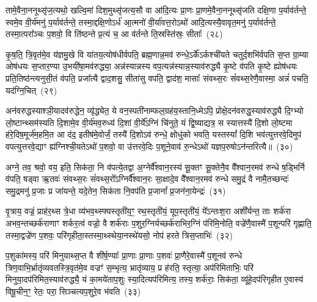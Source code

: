 तामे॒वैना॒ननूथ्सृ॑ज॒त्यथो॒ खल्वि॒मां दिश॒मुथ्सृ॑जत्य॒सौ वा आ॑दि॒त्यः प्रा॒णः प्रा॒णमे॒वैना॒ननूथ्सृ॑जति दक्षि॒णा प॒र्याव॑र्तन्ते॒ स्वमे॒व वी॒र्य॑मनु॑ प॒र्याव॑र्तन्ते॒ तस्मा॒द्दक्षि॒णो\-ऽर्ध॑ आ॒त्मनो॑ वी॒र्या॑वत्त॒रो\-ऽथो॑ आदि॒त्यस्यै॒वावृत॒मनु॑ प॒र्याव॑र्तन्ते॒ तस्मा॒त्परा᳚ञ्चः प॒शवो॒ वि ति॑ष्ठन्ते प्र॒त्यं च॒ आ व॑र्तन्ते ति॒स्रस्ति॑स्रः॒ सीताः᳚~(२८)

कृ॒ष॒ति॒ त्रि॒वृत॑मे॒व य॑ज्ञमु॒खे वि या॑तय॒त्योष॑धीर्वपति॒ ब्रह्म॒णान्न॒मव॑ रुन्धे॒\-ऽर्के᳚\-ऽर्कश्ची॑यते चतुर्द॒शभि॑र्वपति स॒प्त ग्रा॒म्या ओष॑धयः स॒प्तार॒ण्या उ॒भयी॑षा॒मव॑रुद्ध्या॒ अन्न॑स्यान्नस्य वप॒त्यन्न॑स्यान्न॒स्याव॑रुद्ध्यै कृ॒ष्टे व॑पति कृ॒ष्टे ह्योष॑धयः प्रति॒तिष्ठ॑न्त्यनुसी॒तं व॑पति॒ प्रजा᳚त्यै द्वाद॒शसु॒ सीता॑सु वपति॒ द्वाद॑श॒ मासाः᳚ संवथ्स॒रः सं॑वथ्स॒रेणै॒वास्मा॒ अन्नं॑ पचति॒ यद॑ग्नि॒चित्~(२९)

अन॑वरुद्धस्याश्ञी॒यादव॑रुद्धेन॒ व्यृ॑द्ध्येत॒ ये वन॒स्पती॑नाम्फल॒ग्रह॑य॒स्तानि॒ध्मे\-ऽपि॒ प्रोक्षे॒दन॑वरुद्ध॒स्याव॑रुद्ध्यै दि॒ग्भ्यो लो॒ष्टान्थ्सम॑स्यति दि॒शामे॒व वी॒र्य॑मव॒रुध्य॑ दि॒शां वी॒र्ये᳚\-ऽग्निं चि॑नुते॒ यं द्वि॒ष्याद्यत्र॒ स स्यात्तस्यै॑ दि॒शो लो॒ष्टमा ह॑रे॒दिष॒मूर्ज॑म॒हमि॒त आ द॑द॒ इतीष॑मे॒वोर्जं॒ तस्यै॑ दि॒शो\-ऽव॑ रुन्धे॒ क्षोधु॑को भवति॒ यस्तस्यां᳚ दि॒शि भव॑त्युत्तरवे॒दिमुप॑ वपत्युत्तरवे॒द्याꣳ ह्य॑ग्निश्ची॒यते\-ऽथो॑ प॒शवो॒ वा उ॑त्तरवे॒दिः प॒शूने॒वाव॑ रु॒न्धे\-ऽथो॑ यज्ञप॒रुषो\-ऽन॑न्तरित्यै॥~(३०)

{\anuvakamend[{च॒ भ॒व॒त्ये॒ताव॒द्वै पुरु॑षे वी॒र्यं॑ यत्कृ॒ष्टञ्चाकृ॑ष्टं च॒ दिख्सीता॑ अग्नि॒चिदव॒ पञ्च॑विꣳशतिश्च}]}%

अग्ने॒ तव॒ श्रवो॒ वय॒ इति॒ सिक॑ता॒ नि व॑पत्ये॒तद्वा अ॒ग्नेर्वै᳚श्वान॒रस्य॑ सू॒क्तꣳ सू॒क्तेनै॒व वै᳚श्वान॒रमव॑ रुन्धे ष॒ड्भिर्नि व॑पति॒ षड्वा ऋ॒तवः॑ संवथ्स॒रः सं॑वथ्स॒रो᳚\-ऽग्निर्वै᳚श्वान॒रः सा॒क्षादे॒व वै᳚श्वान॒रमव॑ रुन्धे समु॒द्रं वै नामै॒तच्छन्दः॑ समु॒द्रमनु॑ प्र॒जाः प्र जा॑यन्ते॒ यदे॒तेन॒ सिक॑ता नि॒वप॑ति प्र॒जानां᳚ प्र॒जन॑ना॒येन्द्रः॑~(३१)

वृ॒त्राय॒ वज्रं॒ प्राह॑र॒थ्स त्रे॒धा व्य॑भव॒थ्स्फ्यस्तृती॑य॒ꣳ॒ रथ॒स्तृती॑यं॒ यूप॒स्तृती॑यं॒ ये᳚\-ऽन्तःश॒रा अशी᳚र्यन्त॒ ताः शर्क॑रा अभव॒न्तच्छर्क॑राणाꣳ शर्कर॒त्वं वज्रो॒ वै शर्क॑राः प॒शुर॒ग्निर्यच्छर्क॑राभिर॒ग्निं प॑रिमि॒नोति॒ वज्रे॑णै॒वास्मै॑ प॒शून्परि॑ गृह्णाति॒ तस्मा॒द्वज्रे॑ण प॒शवः॒ परि॑गृहीता॒स्तस्मा॒थ्स्थेया॒नस्थे॑यसो॒ नोप॑ हरते त्रिस॒प्ताभिः॑~(३२)

प॒शुका॑मस्य॒ परि॑ मिनुयाथ्स॒प्त वै शी॑र्\mbox{}ष॒ण्याः᳚ प्रा॒णाः प्रा॒णाः प॒शवः॑ प्रा॒णैरे॒वास्मै॑ प॒शूनव॑ रुन्धे त्रिण॒वाभि॒\-र्भ्रातृ॑व्यवतस्त्रि॒वृत॑मे॒व वज्रꣳ॑ स॒म्भृत्य॒ भ्रातृ॑व्याय॒ प्र ह॑रति॒ स्तृत्या॒ अप॑रिमिताभिः॒ परि॑ मिनुया॒दप॑रिमित॒स्याव॑रुद्ध्यै॒ यं का॒मये॑ताप॒शुः स्या॒दित्यप॑रिमित्य॒ तस्य॒ शर्क॑राः॒ सिक॑ता॒ व्यू॑हे॒दप॑रिगृहीत ए॒वास्य॑ विषू॒चीन॒ꣳ॒ रेतः॒ परा॒ सिञ्चत्यप॒शुरे॒व भ॑वति~(३३)

